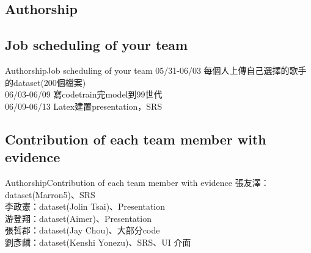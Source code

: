 \documentclass{beamer}
\begin{document}
\begin{CJK}{UTF8}{nkai}
\section*{Authorship}
\subsection*{Job scheduling of your team}
\begin{frame}{Authorship}{Job scheduling of your team}
05/31-06/03 每個人上傳自己選擇的歌手的dataset(200個檔案)\\
06/03-06/09 寫codetrain完model到99世代\\
06/09-06/13 Latex建置presentation，SRS
 \end{frame}

\subsection*{Contribution of each team member with evidence}
\begin{frame}{Authorship}{Contribution of each team member with evidence}
張友澤：dataset(Marron5)、SRS\\
李政憲：dataset(Jolin Tsai)、Presentation\\ 
游登翔：dataset(Aimer)、Presentation\\ 
張哲郡：dataset(Jay Chou)、大部分code\\ 
劉彥麟：dataset(Kenshi Yonezu)、SRS、UI 介面\\
 \end{frame}

\end{CJK}
\end{document}
